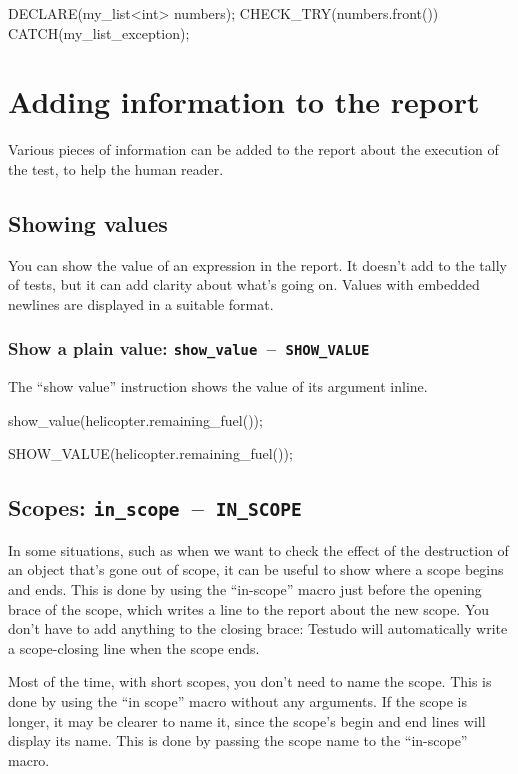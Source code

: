 \documentclass[twoside, a4paper, article]{memoir}
\newcommand*\testudocolor{\color{red!80!blue}}
\newcommand*\testudo[1]{\texttt{\testudocolor{}#1}}
\newcommand*\testudopair[2]{\testudo{#1}~--~\testudo{#2}}
\newcommand\subsectiontestudopair[3]{%
  \subsection[#1]{#1: \testudopair{#2}{#3}}}
\newcommand\subsubsectiontestudopair[3]{%
  \subsubsection[#1]{#1: \testudopair{#2}{#3}}}
\begin{document}
\begin{cpplisting}
DECLARE(my_list<int> numbers);
CHECK_TRY(numbers.front()) CATCH(my_list_exception);
\end{cpplisting}


\section{Adding information to the report}
\label{sec:adding-information-report}

Various pieces of information can be added to the report about the execution of
the test, to help the human reader.

\subsection{Showing values}
\label{sec:showing-values}

You can show the value of an expression in the report.  It doesn't add to the
tally of tests, but it can add clarity about what's going on.  Values with
embedded newlines are displayed in a suitable format.

\subsubsectiontestudopair{Show a plain value}%
  {show\_value}{SHOW\_VALUE}
\label{sec:show-plain-value}

The ``show value'' instruction shows the value of its argument inline.

\begin{cpplisting}
show_value(helicopter.remaining_fuel());
\end{cpplisting}

\begin{cpplisting}
SHOW_VALUE(helicopter.remaining_fuel());
\end{cpplisting}

\subsectiontestudopair{Scopes}{in\_scope}{IN\_SCOPE}
\label{sec:scopes}

In some situations, such as when we want to check the effect of the destruction
of an object that's gone out of scope, it can be useful to show where a scope
begins and ends.  This is done by using the ``in-scope'' macro just before the
opening brace of the scope, which writes a line to the report about the new
scope.  You don't have to add anything to the closing brace: Testudo will
automatically write a scope-closing line when the scope ends.

Most of the time, with short scopes, you don't need to name the scope.  This is
done by using the ``in scope'' macro without any arguments.  If the scope is
longer, it may be clearer to name it, since the scope's begin and end lines
will display its name.  This is done by passing the scope name to the
``in-scope'' macro.
\end{document}
